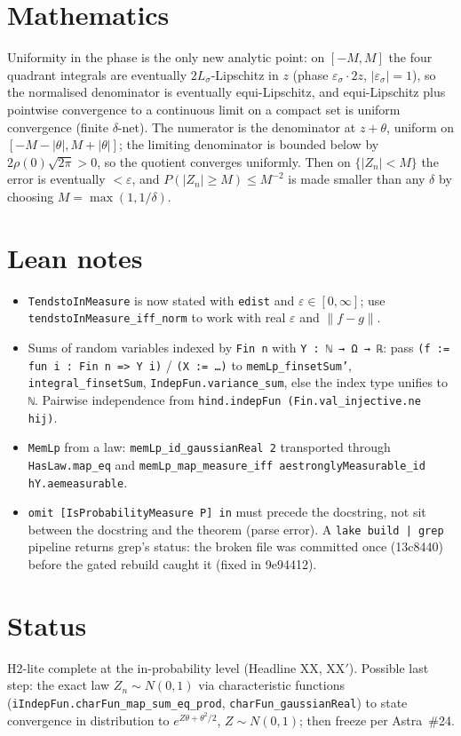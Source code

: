 \documentclass[11pt]{article}
\begin{document}
\section{Mathematics}
Uniformity in the phase is the only new analytic point: on $[-M,M]$ the four quadrant integrals are
eventually $2L_\sigma$-Lipschitz in $z$ (phase $\varepsilon_\sigma\cdot2z$, $|\varepsilon_\sigma|=1$), so
the normalised denominator is eventually equi-Lipschitz, and equi-Lipschitz plus pointwise convergence
to a continuous limit on a compact set is uniform convergence (finite $\delta$-net). The numerator is the
denominator at $z+\theta$, uniform on $[-M-|\theta|,M+|\theta|]$; the limiting denominator is bounded
below by $2\rho(0)\sqrt{2\pi}>0$, so the quotient converges uniformly. Then on $\{|Z_n|<M\}$ the error is
eventually $<\varepsilon$, and $P(|Z_n|\ge M)\le M^{-2}$ is made smaller than any $\delta$ by choosing
$M=\max(1,1/\delta)$.

\section{Lean notes}
\begin{itemize}
\item \texttt{TendstoInMeasure} is now stated with \texttt{edist} and $\varepsilon\in[0,\infty]$; use
  \texttt{tendstoInMeasure\_iff\_norm} to work with real $\varepsilon$ and $\|f-g\|$.
\item Sums of random variables indexed by \texttt{Fin n} with \texttt{Y : ℕ → Ω → ℝ}: pass
  \texttt{(f := fun i : Fin n => Y i)} / \texttt{(X := …)} to \texttt{memLp\_finsetSum'},
  \texttt{integral\_finsetSum}, \texttt{IndepFun.variance\_sum}, else the index type unifies to \texttt{ℕ}.
  Pairwise independence from \texttt{hind.indepFun (Fin.val\_injective.ne hij)}.
\item \texttt{MemLp} from a law: \texttt{memLp\_id\_gaussianReal 2} transported through
  \texttt{HasLaw.map\_eq} and \texttt{memLp\_map\_measure\_iff aestronglyMeasurable\_id hY.aemeasurable}.
\item \texttt{omit [IsProbabilityMeasure P] in} must precede the docstring, not sit between the docstring
  and the theorem (parse error). A \texttt{lake build | grep} pipeline returns grep's status: the broken
  file was committed once (13c8440) before the gated rebuild caught it (fixed in 9e94412).
\end{itemize}

\section{Status}
H2-lite complete at the in-probability level (Headline XX, XX$'$). Possible last step: the exact law
$Z_n\sim N(0,1)$ via characteristic functions (\texttt{iIndepFun.charFun\_map\_sum\_eq\_prod},
\texttt{charFun\_gaussianReal}) to state convergence in distribution to $e^{Z\theta+\theta^2/2}$,
$Z\sim N(0,1)$; then freeze per Astra~\#24.
\end{document}
